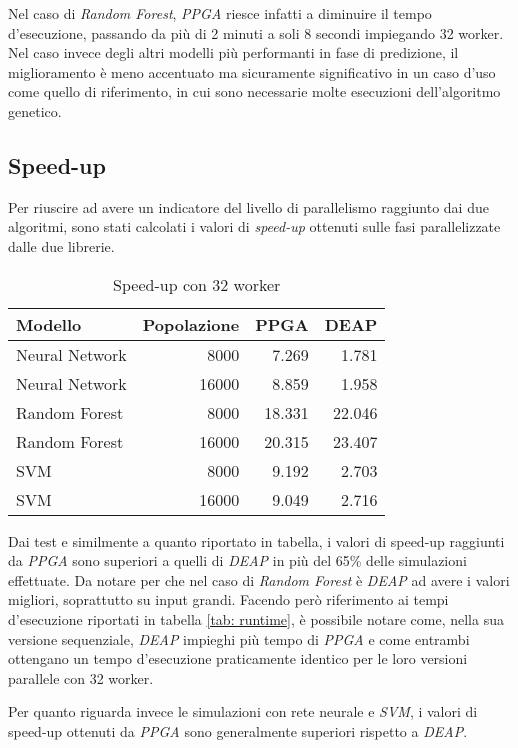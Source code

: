 Nel caso di \textit{Random Forest}, \textit{PPGA} riesce infatti a diminuire il
tempo d'esecuzione, passando da più di 2 minuti a soli 8 secondi impiegando 32
worker. Nel caso invece degli altri modelli più performanti in fase di
predizione, il miglioramento è meno accentuato ma sicuramente significativo in
un caso d'uso come quello di riferimento, in cui sono necessarie molte
esecuzioni dell'algoritmo genetico.

\subsection{Speed-up}

Per riuscire ad avere un indicatore del livello di parallelismo raggiunto dai
due algoritmi, sono stati calcolati i valori di \textit{speed-up} ottenuti
sulle fasi parallelizzate dalle due librerie.

\begin{table}[H]
	\centering
	\begin{tabular}{lrrr}
		\toprule
		Modello        & Popolazione & PPGA   & DEAP   \\
		\midrule
		Neural Network & 8000        & 7.269  & 1.781  \\
		Neural Network & 16000       & 8.859  & 1.958  \\
		Random Forest  & 8000        & 18.331 & 22.046 \\
		Random Forest  & 16000       & 20.315 & 23.407 \\
		SVM            & 8000        & 9.192  & 2.703  \\
		SVM            & 16000       & 9.049  & 2.716  \\
		\bottomrule
	\end{tabular}
	\caption{Speed-up con 32 worker}
	\label{speed-up}
\end{table}

Dai test e similmente a quanto riportato in tabella, i valori di speed-up
raggiunti da \textit{PPGA} sono superiori a quelli di \textit{DEAP} in più
del 65\% delle simulazioni effettuate. Da notare per che nel caso di
\textit{Random Forest} è \textit{DEAP} ad avere i valori migliori, soprattutto
su input grandi. Facendo però riferimento ai tempi d'esecuzione riportati in
tabella \ref{tab: runtime}, è possibile notare come, nella sua versione
sequenziale, \textit{DEAP} impieghi più tempo di \textit{PPGA} e come entrambi
ottengano un tempo d'esecuzione praticamente identico per le loro versioni
parallele con 32 worker.

Per quanto riguarda invece le simulazioni con rete neurale e \textit{SVM}, i
valori di speed-up ottenuti da \textit{PPGA} sono generalmente superiori
rispetto a \textit{DEAP}.

